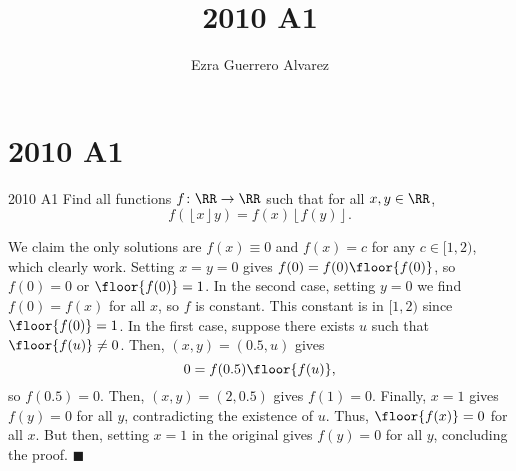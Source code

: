 \documentclass[14pt]{article}
\title{2010 A1}
\author{Ezra Guerrero Alvarez}
\begin{document}
\maketitle
	
\section*{2010 A1}

\begin{statement}{2010 A1}
	Find all functions $f \colon \RR \to \RR$
	such that for all $x,y \in \RR$,
	\[ f(\left\lfloor x\right\rfloor y)
	= f(x)\left\lfloor f(y)\right\rfloor. \]
\end{statement}
We claim the only solutions are $f(x)\equiv0$ and $f(x)=c$ for any $c\in[1,2)$, which clearly work. Setting $x=y=0$ gives $f(0)=f(0)\floor{f(0)}$, so $f(0)=0$ or $\floor{f(0)}=1$. In the second case, setting $y=0$ we find $f(0)=f(x)$ for all $x$, so $f$ is constant. This constant is in $[1,2)$ since $\floor{f(0)}=1$. In the first case, suppose there exists $u$ such that $\floor{f(u)}\ne0$. Then, $(x,y)=(0.5,u)$ gives
\[ 0=f(0.5)\floor{f(u)}, \]
so $f(0.5)=0$. Then, $(x,y)=(2,0.5)$ gives $f(1)=0$. Finally, $x=1$ gives $f(y)=0$ for all $y$, contradicting the existence of $u$. Thus, $\floor{f(x)}=0$ for all $x$. But then, setting $x=1$ in the original gives $f(y)=0$ for all $y$, concluding the proof. $\blacksquare$
	
\end{document}
